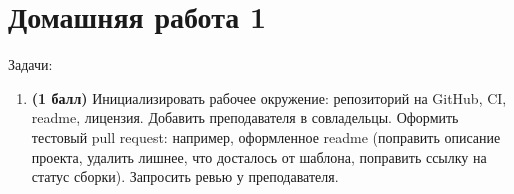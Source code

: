 \section{Домашняя работа 1}

Задачи:

\begin{enumerate}
\item \textbf{(1 балл)} Инициализировать рабочее окружение: репозиторий на GitHub, CI, readme, лицензия. 
Добавить преподавателя в совладельцы. Оформить тестовый pull request: например, оформленное readme (поправить описание проекта, удалить лишнее, что досталось от шаблона, поправить ссылку на статус сборки). Запросить ревью у преподавателя.
\end{enumerate}